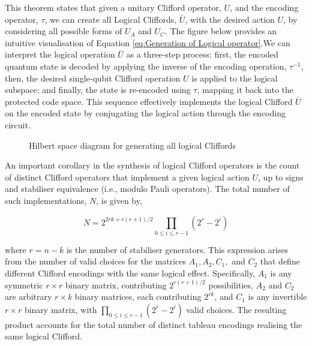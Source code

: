 This theorem states that given a unitary Clifford operator, \(U\), and the encoding operator, \(\tau\),  we can create all Logical Cliffords, \(\bar{U}\), with the desired action \(U\), by considering all possible forms of \(U_A\) and \(U_C\). The figure below provides an intuitive visualisation of Equation \ref{eq:Generation of Logical operator}.We can interpret the logical operation \(\bar{U}\) as a three-step process: first, the encoded quantum state is decoded by applying the inverse of the encoding operation, \(\tau^{-1}\), then, the desired single-qubit Clifford operation \(U\) is applied to the logical subspace; and finally, the state is re-encoded using \(\tau\), mapping it back into the protected code space. This sequence effectively implements the logical Clifford \(\bar{U}\) on the encoded state by conjugating the logical action through the encoding circuit.

\begin{figure}[h]
    \centering
    \begin{large}
    \end{large}
    \caption{Hilbert space diagram for generating all logical Cliffords}
    \label{fig:Hilbert space diagram}
\end{figure}

An important corollary in the synthesis of logical Clifford operators is the count of distinct Clifford operators that implement a given logical action \(U\), up to signs and stabiliser equivalence (i.e., modulo Pauli operators). The total number of such implementations, \(N\), is given by,

\begin{equation}
\label{eq:number of possible logical cliffords}
   N=2^{2rk + r(r+1)/2}\prod_{0 \le i \le r-1}(2^r - 2^i)
\end{equation}

where \(r=n-k\) is the number of stabiliser generators. This expression arises from the number of valid choices for the matrices \(A_1,A_2,C_1,\) and \(C_2\) that define different Clifford encodings with the same logical effect. Specifically, \(A_1\) is any symmetric \(r\times r\) binary matrix, contributing \(2^{r(r+1)/2}\) possibilities, \(A_2\) and \(C_2\) are arbitrary \(r\times k\) binary matrices, each contributing \(2^{rk}\), and \(C_1\) is any invertible \(r\times r\) binary matrix, with \(\prod_{0 \le i \le r-1}(2^r - 2^i)\) valid choices. The resulting product accounts for the total number of distinct tableau encodings realising the same logical Clifford. 

